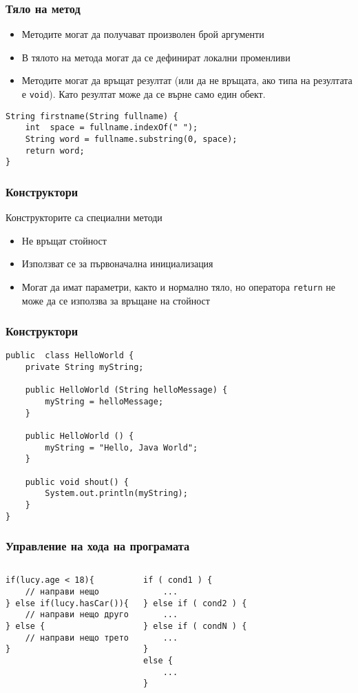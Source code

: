\documentclass[ignorenonframetext, hyperref=unicode,unicode]{beamer}
\begin{document}
\begin{frame}[containsverbatim]\frametitle{Тяло на метод}
\begin{itemize}
\item Методите могат да получават произволен брой аргументи
\item В тялото на метода могат да се дефинират локални променливи
\item Методите могат да връщат резултат (или да не връщата, 
ако типа на резултата е \lstinline{void}). Като резултат може да се върне 
само един обект.
\end{itemize}

\begin{lstlisting}
String firstname(String fullname) {
	int  space = fullname.indexOf(" ");
	String word = fullname.substring(0, space);
	return word;
}
\end{lstlisting}
\end{frame}



\begin{frame}[containsverbatim]\frametitle{Конструктори}
Конструкторите са специални методи
\begin{itemize}
 \item Не връщат стойност
 \item Използват се за първоначална инициализация
 \item Могат да имат параметри, както и нормално тяло, но оператора \lstinline{return}
 не може да се използва за връщане на стойност
\end{itemize}
\end{frame}

\begin{frame}[containsverbatim]\frametitle{Конструктори}
\begin{lstlisting}
public  class HelloWorld {
 	private String myString;
	
 	public HelloWorld (String helloMessage) {
 		myString = helloMessage;
	}
	
 	public HelloWorld () {
 		myString = "Hello, Java World";
	}
	
 	public void shout() {
 		System.out.println(myString);
	}
}\end{lstlisting}
\end{frame}

\begin{frame}[containsverbatim]\frametitle{Управление на хода на програмата}
\begin{columns}
\begin{lstlisting}
if(lucy.age < 18){
	// направи нещо
} else if(lucy.hasCar()){
 	// направи нещо друго
} else {
	// направи нещо трето
}
\end{lstlisting}
\begin{lstlisting}
if ( cond1 ) {
	...
} else if ( cond2 ) {
 	...
} else if ( condN ) {
 	...
}
else {
	...
} 
\end{lstlisting}
\end{columns}
\end{frame}
\end{document}
